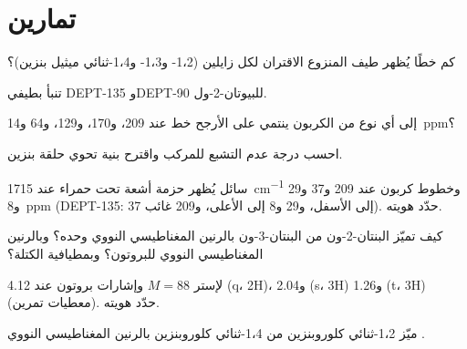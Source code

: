 \section{تمارين}

\begin{exercise}[$\star$]\label{exo:b2:structure-determination:1}
كم خطًا يُظهر طيف  المنزوع الاقتران لكل زايلين (1،2- و1،3- 
و1،4-ثنائي ميثيل بنزين)؟
\end{exercise}

\begin{exercise}[$\star$]\label{exo:b2:structure-determination:2}
تنبأ بطيفي DEPT-135 وDEPT-90 للبيوتان-2-ول.
\end{exercise}

\begin{exercise}[$\star$]\label{exo:b2:structure-determination:3}
إلى أي نوع من الكربون ينتمي على الأرجح خط عند 209، و170، و129، و64 و14~ppm؟
\end{exercise}

\begin{exercise}[$\star$]\label{exo:b2:structure-determination:4}
احسب درجة عدم التشبع للمركب  واقترح بنية تحوي حلقة بنزين.
\end{exercise}

\begin{exercise}[$\star\star$]\label{exo:b2:structure-determination:5}
سائل  يُظهر حزمة أشعة تحت حمراء عند \qty{1715}{cm^{-1}} وخطوط كربون عند 209 و37 و29 و8~ppm
(DEPT-135: 37 إلى الأسفل، و29 و8 إلى الأعلى، و209 غائب). حدّد هويته.
\end{exercise}

\begin{exercise}[$\star\star$]\label{exo:b2:structure-determination:6}
كيف تميّز البنتان-2-ون من البنتان-3-ون بالرنين المغناطيسي النووي  وحده؟ وبالرنين المغناطيسي النووي للبروتون؟ 
وبمطيافية الكتلة؟
\end{exercise}

\begin{exercise}[$\star\star$]\label{exo:b2:structure-determination:7}
لإستر $M = 88$ وإشارات بروتون عند 4.12 (q، 2H)، و2.04 (s، 3H) و1.26 (t، 3H) (معطيات
تمرين). حدّد هويته.
\end{exercise}

\begin{exercise}[$\star\star$]\label{exo:b2:structure-determination:8}
ميّز 1،2-ثنائي كلوروبنزين من 1،4-ثنائي كلوروبنزين بالرنين المغناطيسي النووي .
\end{exercise}

